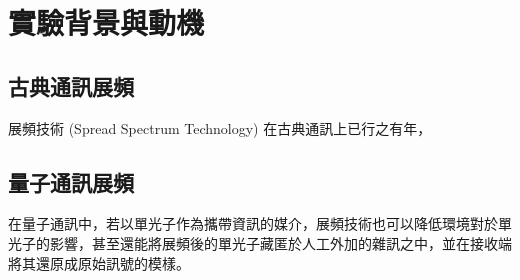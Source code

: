 \documentclass[class=NCU_thesis, crop=false]{standalone}
\begin{document}
\chapter{實驗背景與動機}
\section{古典通訊展頻}
展頻技術 (Spread Spectrum Technology) 在古典通訊上已行之有年，

\section{量子通訊展頻}
在量子通訊中，若以單光子作為攜帶資訊的媒介，展頻技術也可以降低環境對於單光子的影響，甚至還能將展頻後的單光子藏匿於人工外加的雜訊之中，並在接收端將其還原成原始訊號的模樣。
\end{document}
